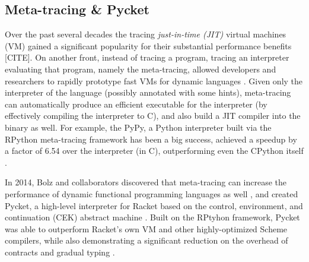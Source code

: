 \subsection{Meta-tracing \& Pycket}
\label{subsec:meta-trace}

Over the past several decades the tracing \emph{just-in-time (JIT)}
virtual machines (VM) gained a significant popularity for their
substantial performance benefits [CITE]. On another front, instead of
tracing a program, tracing an interpreter evaluating that program,
namely the meta-tracing, allowed developers and researchers to rapidly
prototype fast VMs for dynamic languages \cite{bolz09}. Given only the
interpreter of the language (possibly annotated with some hints),
meta-tracing can automatically produce an efficient executable for the
interpreter (by effectively compiling the interpreter to C), and also
build a JIT compiler into the binary as well. For example, the PyPy, a
Python interpreter built via the RPython meta-tracing framework has
been a big success, achieved a speedup by a factor of 6.54 over the
interpreter (in C), outperforming even the CPython itself
\cite{bolz09}.

In 2014, Bolz and collaborators discovered that meta-tracing can
increase the performance of dynamic functional programming languages
as well \cite{bolz14-racket}, and created Pycket, a high-level
interpreter for Racket based on the control, environment, and
continuation (CEK) abstract machine \cite{felleisen87}. Built on the
RPtyhon framework, Pycket was able to outperform Racket's own VM and
other highly-optimized Scheme compilers, while also demonstrating a
significant reduction on the overhead of contracts and gradual typing
\cite{pycket15}.
